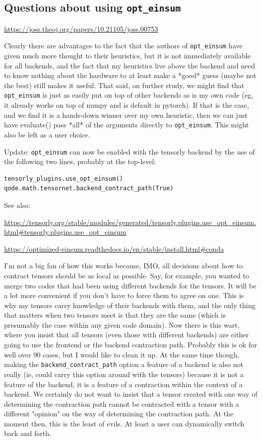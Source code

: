 \documentclass[12pt,letterpaper]{article}
\begin{document}
	\subsection{Questions about using \texttt{opt\_einsum}}

\url{https://joss.theoj.org/papers/10.21105/joss.00753}

Clearly there are advantages to the fact that the authors of \texttt{opt\_einsum} have given much more
thought to their heuristics, but it is not immediately available for all backends, and the
fact that my heuristics live above the backend and need to know nothing about the hardware
to at least make a *good* guess (maybe not the best) still makes it useful.  That said, 
on further study, we might find that \texttt{opt\_einsum} is just as easily put on top of other backends
as is my own code (eg, it already works on top of numpy and is default in pytorch).
If that is the case, and we find it is a hands-down winner over my own heuristic, then we can
just have evaluate() pass *all* of the arguments directly to \texttt{opt\_einsum}.  This might also
be left as a user choice.

Update:
\texttt{opt\_einsum} can now be enabled with the tensorly backend by the use of the following two lines, probably at the top-level:

\begin{lstlisting}
tensorly_plugins.use_opt_einsum()
qode.math.tensornet.backend_contract_path(True)
\end{lstlisting}

See also:

  \url{https://tensorly.org/stable/modules/generated/tensorly.plugins.use_opt_einsum.html#tensorly.plugins.use_opt_einsum}

  \url{https://optimized-einsum.readthedocs.io/en/stable/install.html#conda}

I'm not a big fan of how this works because, IMO, all decisions about how to contract tensors should
be as local as possible.  Say, for example, you wanted to merge two codes that had been using different
backends for the tensors.  It will be a lot more convenient if you don't have to force them to agree on one.
This is why my tensors carry knowledge of their backends with them, and the only thing that matters when
two tensors meet is that they are the same (which is presumably the case within any given code domain).
Now there is this wart, where you insist that all tensors (even those with different backends) are either
going to use the frontend or the backend contraction path.  Probably this is ok for well over 90%
cases, but I would like to clean it up.  At the same time though, making the \texttt{backend\_contract\_path}
option a feature of a backend is also not really (ie, could carry this option around with the tensors)
because it is not a feature of the backend, it is a feature of a contraction within the context of a 
backend.  We certainly do not want to insist that a tensor created with one way of determining the contraction
path cannot be contracted with a tensor with a different "opinion" on the way of determining the contraction
path.  At the moment then, this is the least of evils.  At least a user can dynamically switch back and forth.
\end{document}
